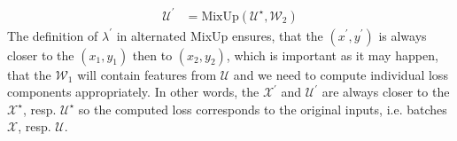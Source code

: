 \begin{enumerate}
\begin{align*}
            \mathcal{U}^\prime &= \text{MixUp}(\mathcal{U}^\star,\mathcal{W}_2)
        \end{align*}
        The definition of $\lambda^\prime$ in alternated MixUp ensures, that the $(x^\prime,y^\prime)$ is always closer to the 
        $(x_1,y_1)$ then to $(x_2,y_2)$, which is important as it may happen, that the $\mathcal{W}_1$ will contain features from $\mathcal{U}$
        and we need to compute individual loss components appropriately. In other words, the $\mathcal{X}^\prime$ and $\mathcal{U}^\prime$ are always 
        closer to the $\mathcal{X}^\star$, resp. $\mathcal{U}^\star$ so the computed loss corresponds to the original inputs, i.e. batches $\mathcal{X}$, 
        resp. $\mathcal{U}$.
\end{enumerate}




